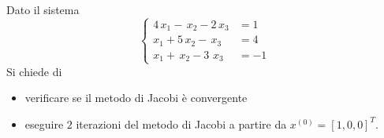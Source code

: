 Dato il sistema
\[ \left \{
\begin{array}{ll}
4\,  x_1-\, x_2-2\,x_3 &=1\\
x_1+5\, x_2 -\, x_3&=4 \\
x_1+\,x_2 - 3\, \,x_3&=-1
\end{array}
\right.
\]
Si chiede di 
\begin{itemize}
\item verificare se il metodo di Jacobi  \`{e} convergente
\item eseguire  $2$ iterazioni del metodo di Jacobi a partire da $x^{(0)}=[1, 0, 0]^T.$
\end{itemize} 